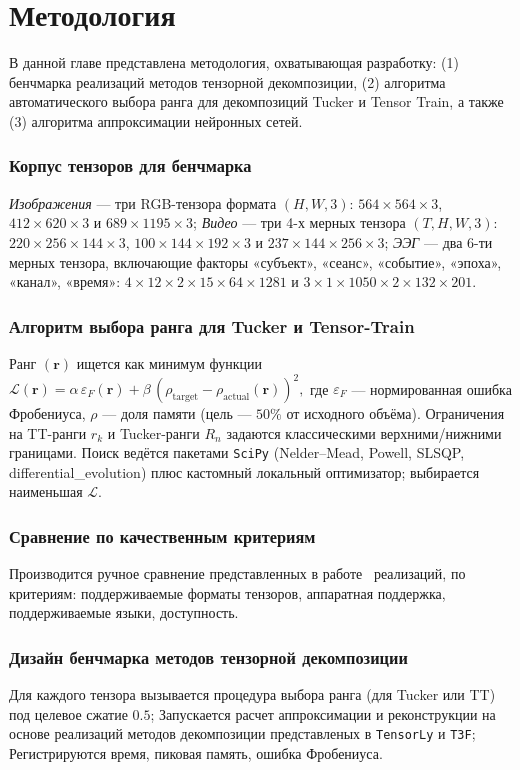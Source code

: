 \chapter{Методология}
\label{chap:methodology}

В данной главе представлена методология, охватывающая разработку: (1) бенчмарка реализаций методов тензорной декомпозиции, (2) алгоритма автоматического выбора ранга для декомпозиций Tucker и Tensor Train, а также (3) алгоритма аппроксимации нейронных сетей.

\subsection*{Корпус тензоров для бенчмарка}
\emph{Изображения} — три RGB-тензора формата \((H,W,3)\): $564\times564\times3$, $412\times620\times3$ и $689\times1195\times3$; \emph{Видео} — три 4-х мерных тензора \((T,H,W,3)\): $220\times256\times144\times3$, $100\times144\times192\times3$ и $237\times144\times256\times3$; \emph{ЭЭГ} — два 6-ти мерных тензора, включающие факторы «субъект», «сеанс», «событие», «эпоха», «канал», «время»: $4\times12\times2\times15\times64\times1281$ и $3\times1\times1050\times2\times132\times201$.

\subsection*{Алгоритм выбора ранга для Tucker и Tensor-Train}
Ранг $(\mathbf r)$ ищется как минимум функции
$\mathcal{L}(\mathbf r)=
\alpha\,\varepsilon_F(\mathbf r)+
\beta\,(\rho_{\text{target}}-\rho_{\text{actual}}(\mathbf r))^{2},$
где $\varepsilon_F$ — нормированная ошибка Фробениуса,  
$\rho$ — доля памяти (цель — $50\%$ от исходного объёма).  
Ограничения на TT-ранги $r_k$ и Tucker-ранги $R_n$ задаются классическими верхними/нижними границами.  
Поиск ведётся пакетами \texttt{SciPy} (Nelder–Mead, Powell, SLSQP, differential\_evolution) плюс кастомный локальный оптимизатор; выбирается наименьшая $\mathcal{L}$.

\subsection*{Сравнение по качественным критериям}
Производится ручное сравнение представленных в работе~\cite{tensor_software_landscape} реализаций, по критериям: поддерживаемые форматы тензоров, аппаратная поддержка, поддерживаемые языки, доступность.

\subsection*{Дизайн бенчмарка методов тензорной декомпозиции}
Для каждого тензора вызывается процедура выбора ранга (для Tucker или TT) под целевое сжатие $0.5$; Запускается расчет аппроксимации и реконструкции на основе реализаций методов декомпозиции представленых в \texttt{TensorLy} и \texttt{T3F}; Регистрируются время, пиковая память, ошибка Фробениуса.

